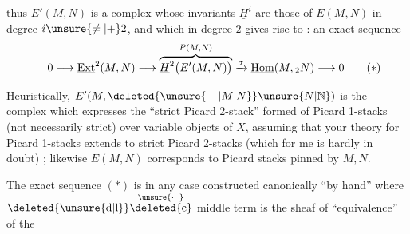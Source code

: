 
thus $E'(M,N)$ is a complex whose invariants $\underline{H}^{i}$ are those of $E(M,N)$ in degree $i\unsure{\ne|+}2$, and which in degree $2$ gives rise to : an exact sequence
\[
0\longrightarrow\underline{\mathrm{Ext}}^{2}(M,N)\longrightarrow
\overbrace{\underline{H}^{2}\bigl(E'(M,N)\bigr)}^{P(M,N)}
\xrightarrow{\sigma}\underline{\mathrm{Hom}}(M,{}_{2}N)\longrightarrow 0
\tag*{\makebox[0pt][r]{\makebox[\displaywidth][l]{$(*)$}}}
\]

Heuristically, $E'(M,\deleted{\unsure{\phantom{M}|M|N}}\unsure{N|\mathbb{N}})$ is the complex which expresses the ``strict Picard 2-stack'' formed of Picard 1-stacks (not necessarily strict)  over variable objects of $X$, assuming that your theory for  Picard 1-stacks extends to strict Picard 2-stacks (which for me is hardly in doubt) ; likewise $E(M,N)$ corresponds to  Picard stacks pinned by $M,N$.

The exact sequence $(*)$ is in any case constructed canonically ``by hand''\unsure{,|)} where $\deleted{\unsure{\mathrm{d}|\mathrm{l}}}\overset{\unsure{\cdot|\phantom{\cdot}}}{\deleted{\mathrm{e}}}$ middle term is the sheaf of    ``equivalence'' of the

